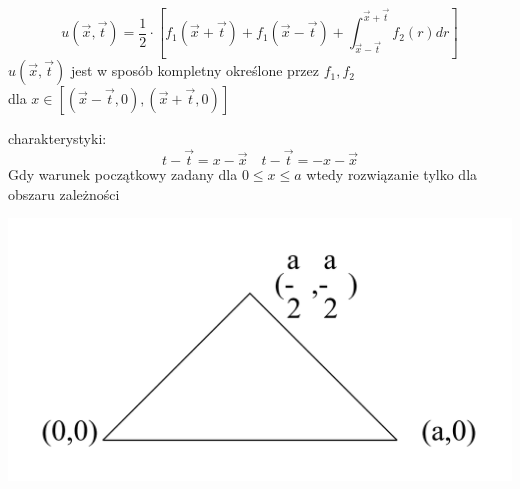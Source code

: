 \begin{frame}
\begin{equation}u(\overrightarrow{x},\overrightarrow{t}) = \frac{1}{2}\cdot \left [f_1(\overrightarrow{x}+\overrightarrow{t})+f_1(\overrightarrow{x} -\overrightarrow{t}) +\int_{\overrightarrow{x}-\overrightarrow{t}}^{\overrightarrow{x}+\overrightarrow{t}} f_2(r)dr
\right ] \end{equation}
$u(\overrightarrow{x},\overrightarrow{t})$ jest w sposób kompletny określone przez $f_1, f_2$ \\
dla $x \in [(\overrightarrow{x}-\overrightarrow{t},0),(\overrightarrow{x}+\overrightarrow{t},0)]$

charakterystyki:
\begin{equation} t - \overrightarrow{t} = x - \overrightarrow{x}   \quad t - \overrightarrow{t} = -x - \overrightarrow{x}\end{equation}
\vspace{1mm}
Gdy warunek początkowy zadany dla $0 \le x \le a$ wtedy rozwiązanie tylko dla obszaru zależności
 \centerline{\includegraphics[height = 0.4 \textheight]{img/23/mildy_nonlinear2}}
\end{frame}
